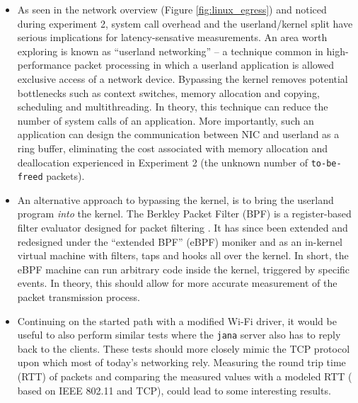 \begin{itemize}

\item As seen in the network overview (Figure \ref{fig:linux_egress}) and
noticed during experiment 2, system call overhead and the userland/kernel
split have serious implications for latency-sensative measurements. An area
worth exploring is known as ``userland networking'' -- a technique common in
high-performance packet processing in which a userland application is allowed
exclusive access of a network device. Bypassing the kernel removes potential
bottlenecks such as context switches, memory allocation and copying,
scheduling and multithreading. In theory, this technique can reduce the number
of system calls of an application. More importantly, such an application can
design the communication between NIC and userland as a ring buffer,
eliminating the cost associated with memory allocation and deallocation
experienced in Experiment 2 (the unknown number of \texttt{to-be-freed}
packets).

\item An alternative approach to bypassing the kernel, is to bring the
userland program \emph{into} the kernel. The Berkley Packet Filter (BPF) is a
register-based filter evaluator designed for packet filtering
\cite{10.5555/1267303.1267305}. It has since been extended and redesigned
under the ``extended BPF'' (eBPF) moniker and as an in-kernel virtual machine
with filters, taps and hooks all over the kernel. In short, the eBPF machine
can run arbitrary code inside the kernel, triggered by specific events. In
theory, this should allow for more accurate measurement of the packet
transmission process.


\item Continuing on the started path with a modified Wi-Fi driver, it would be
useful to also perform similar tests where the \texttt{jana} server also has
to reply back to the clients. These tests should more closely mimic the TCP
protocol upon which most of today's networking rely. Measuring the round trip
time (RTT) of packets and comparing the measured values with a modeled RTT (
based on IEEE 802.11 and TCP), could lead to some interesting results.



\end{itemize}
